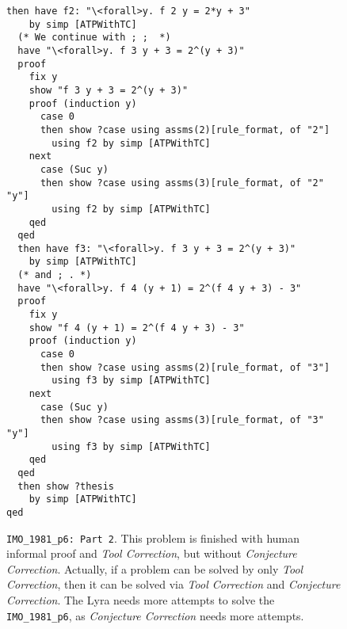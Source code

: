 \documentclass{article} \usepackage{iclr2024_conference,times}
\def\methodOneFull{\textit{Tool Correction}\xspace}
\def\methodTwoFull{\textit{Conjecture Correction}\xspace}
\def\shortname{Lyra\xspace}
\begin{document}
\begin{figure}[H]
\begin{tcolorbox}[colback=mybrown!5!white,colframe=mybrown!75!black]
\begin{small}

\begin{lstlisting}[style=isabelle]
  then have f2: "\<forall>y. f 2 y = 2*y + 3"
    by simp [ATPWithTC]
  (* We continue with ; ;  *)
  have "\<forall>y. f 3 y + 3 = 2^(y + 3)"
  proof
    fix y
    show "f 3 y + 3 = 2^(y + 3)"
    proof (induction y)
      case 0
      then show ?case using assms(2)[rule_format, of "2"]
        using f2 by simp [ATPWithTC]
    next
      case (Suc y)
      then show ?case using assms(3)[rule_format, of "2" "y"]
        using f2 by simp [ATPWithTC]
    qed
  qed
  then have f3: "\<forall>y. f 3 y + 3 = 2^(y + 3)"
    by simp [ATPWithTC]
  (* and ; . *)
  have "\<forall>y. f 4 (y + 1) = 2^(f 4 y + 3) - 3"
  proof
    fix y
    show "f 4 (y + 1) = 2^(f 4 y + 3) - 3"
    proof (induction y)
      case 0
      then show ?case using assms(2)[rule_format, of "3"]
        using f3 by simp [ATPWithTC]
    next
      case (Suc y)
      then show ?case using assms(3)[rule_format, of "3" "y"]
        using f3 by simp [ATPWithTC]
    qed
  qed
  then show ?thesis
    by simp [ATPWithTC]
qed

\end{lstlisting}
\end{small}
\end{tcolorbox}
\caption{
\small
\texttt{IMO\_1981\_p6: Part 2}. This problem is finished with human informal proof and \methodOneFull, but without \methodTwoFull. Actually, if a problem can be solved by only \methodOneFull, then it can be solved via \methodOneFull and \methodTwoFull. The \shortname needs more attempts to solve the \texttt{IMO\_1981\_p6}, as \methodTwoFull needs more attempts.}
\label{fig:case_study imo 1981 p6 Part 2}
\end{figure}
\end{document}

